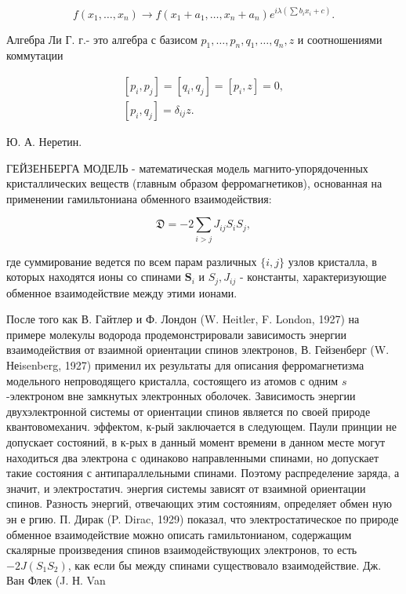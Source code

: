 \documentclass[10pt]{article}
\begin{document}
\[

f\left(x_{1}, \ldots, x_{n}\right) \rightarrow f\left(x_{1}+a_{1}, \ldots, x_{n}+a_{n}\right) e^{i \lambda\left(\sum b_{i} x_{i}+c\right)} .

\]



Алгебра Ли Г. г.- это алгебра с базисом $p_{1}, \ldots, p_{n}, q_{1}, \ldots, q_{n}, z$ и соотношениями коммутации



\[

\begin{gathered}

{\left[p_{i}, p_{j}\right]=\left[q_{i}, q_{j}\right]=\left[p_{i}, z\right]=0,} \\

{\left[p_{i}, q_{j}\right]=\delta_{i j} z .}

\end{gathered}

\]



Ю. А. Неретин.



ГЕЙЗЕНБЕРГА МОДЕЛЬ - математическая модель магнито-упорядоченных кристаллических веществ (главным образом ферромагнетиков), основанная на применении гамильтониана обменного взаимодействия:



\[

\mathfrak{D}=-2 \sum_{i>j} J_{i j} S_{i} S_{j},

\]



где суммирование ведется по всем парам различных $\{i, j\}$ узлов кристалла, в которых находятся ионы со спинами $\boldsymbol{S}_{i}$ и $S_{j}, J_{i j}$ - константы, характеризующие обменное взаимодействие между этими ионами.



После того как В. Гайтлер и Ф. Лондон (W. Heitler, F. London, 1927) на примере молекулы водорода продемонстрировали зависимость энергии взаимодействия от взаимной ориентации спинов электронов, В. Гейзенберг (W. Неisenberg, 1927) применил их результаты для описания ферромагнетизма модельного непроводящего кристалла, состоящего из атомов с одним $s$-электроном вне замкнутых электронных оболочек. Зависимость энергии двухэлектронной системы от ориентации спинов является по своей природе квантовомеханич. эффектом, к-рый заключается в следующем. Паули принции не допускает состояний, в к-рых в данный момент времени в данном месте могут находиться два электрона с одинаково направленными спинами, но допускает такие состояния с антипараллельными спинами. Поэтому распределение заряда, а значит, и электростатич. энергия системы зависят от взаимной ориентации спинов. Разность энергий, отвечающих этим состояниям, определяет обмен ную эн е ргию. П. Дирак (P. Dirac, 1929) показал, что электростатическое по природе обменное взаимодействие можно описать гамильтонианом, содержащим скалярные произведения спинов взаимодействующих электронов, то есть $-2 J\left(S_{1} S_{2}\right)$, как если бы между спинами существовало взаимодействие. Дж. Ван Флек (J. Н. Van
\end{document}
